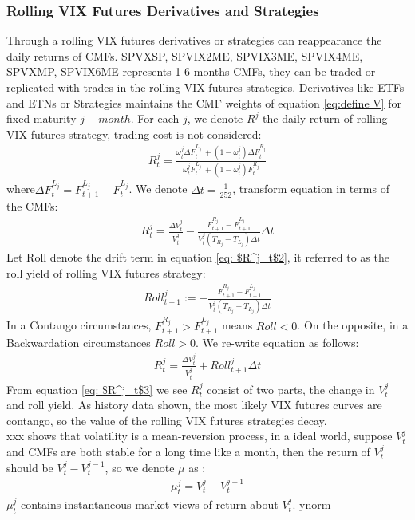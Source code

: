\documentclass[10pt,letterpaper]{article}
\begin{document}
\subsubsection*{Rolling VIX Futures Derivatives and Strategies}
Through a rolling VIX futures derivatives or strategies can reappearance the daily returns of CMFs.
SPVXSP, SPVIX2ME, SPVIX3ME, SPVIX4ME, SPVXMP, SPVIX6ME represents 1-6 months CMFs, they can be traded or replicated with trades in the rolling VIX futures strategies.
Derivatives like ETFs and ETNs or Strategies maintains the CMF weights of equation \ref{eq:define V} for fixed maturity $j-month$. For each $j$, we denote $R^j$
the daily return of rolling VIX futures strategy, trading cost is not considered:
\begin{eqnarray}
    {R^j_t} = \frac{\omega^j_t{\Delta}F^{L_j}_t\ + (1 - \omega^j_t){\Delta}F^{R_j}_t}{\omega^j_tF^{L_j}_t\ + (1 - \omega^j_t)F^{R_j}_t}
\end{eqnarray}
where${\Delta}F^{L_j}_t = F^{L_j}_{t+1} - F^{L_j}_t$. We denote ${\Delta}t = \frac{1}{252}$, transform equation in terms of the CMFs:
\begin{eqnarray}
\label{eq: $R^j_t$2}
    {R^j_t} = \frac{{\Delta}V^j_t}{V^j_t} - \frac{F^{R_j}_{t+1} - F^{L_j}_{t+1}}{V^j_t(T_{R_j} - T_{L_j}){\Delta}t}{\Delta}t
\end{eqnarray}
Let Roll denote the drift term in equation \ref{eq: $R^j_t$2}, it referred to as the roll yield of rolling VIX futures strategy:
\begin{eqnarray}
    {Roll^j_{t+1}} := - \frac{F^{R_j}_{t+1} - F^{L_j}_{t+1}}{V^j_t(T_{R_j} - T_{L_j}){\Delta}t}
\end{eqnarray}
In a Contango circumstances, $F^{R_j}_{t+1} > F^{L_j}_{t+1}$ means $Roll < 0$. On the opposite, in a Backwardation circumstances $Roll > 0$.
We re-write equation as follows:
\begin{eqnarray}
\label{eq: $R^j_t$3}
    {R^j_t} = \frac{{\Delta}V^j_t}{V^j_t} + Roll^j_{t+1}{\Delta}t
\end{eqnarray}
From equation \ref{eq: $R^j_t$3} we see $R^j_t$ consist of two parts, the change in $V^j_t$ and roll yield. As history data shown, the most likely VIX futures
curves are contango, so the value of the rolling VIX futures strategies decay.
\\xxx shows that volatility is a mean-reversion process, in a ideal world, suppose $V^j_t$ and CMFs are both stable for a long time like a month, then
the return of $V^j_t$ should be $V^j_t - V^{j-1}_t$, so we denote $\mu$ as :
\begin{eqnarray}
\label{eq: mu}
    {\mu^j_t} = V^j_t - V^{j-1}_t
\end{eqnarray}
$\mu^j_t$ contains instantaneous market views of return about $V^j_t$.
ynorm
\end{document}

